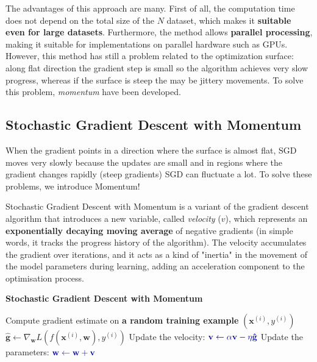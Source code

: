 The advantages of this approach are many. First of all, the computation time does not depend on the total size of the $N$ dataset, which makes it \textbf{suitable even for large datasets}. Furthermore, the method allows \textbf{parallel processing}, making it suitable for implementations on parallel hardware such as GPUs. However, this method has still a problem related to the optimization surface: along flat direction the gradient step is small so the algorithm achieves very slow progress, whereas if the surface is steep the may be jittery movements.  To solve this problem, \textit{momentum} have been developed.

\subsection{Stochastic Gradient Descent with Momentum}
When the gradient points in a direction where the surface is almost flat, SGD moves very slowly because the updates are small and in regions where the gradient changes rapidly (steep gradients) SGD can fluctuate a lot. To solve these problems, we introduce Momentum!

Stochastic Gradient Descent with Momentum is a variant of the gradient descent algorithm that introduces a new variable, called \textit{velocity} (\(v\)), which represents an \textbf{exponentially decaying moving average} of negative gradients (in simple words, it tracks the progress history of the algorithm). The velocity accumulates the gradient over iterations, and it acts as a kind of "inertia" in the movement of the model parameters during learning, adding an acceleration component to the optimisation process.

\begin{algorithm}
\renewcommand\thealgorithm{}
\caption{\textbf{\textcolor{mygreen}{Stochastic Gradient Descent with Momentum}}}
\begin{algorithmic}[1]
    \STATE Compute gradient estimate on \textbf{\textcolor{myred}{a random training example}} $(\mathbf{x}^{(i)}, y^{(i)})$
    \STATE 
    $
    \mathbf{\hat{g}} \leftarrow\nabla_{\mathbf{w}} L(f(\mathbf{x}^{(i)},\mathbf{w}), y^{(i)})
    $
    \STATE Update the velocity:
    $\textcolor{mybluee}{\mathbf{v} \leftarrow \alpha \mathbf{v} - \eta \mathbf{\hat{g}}}$
    \STATE Update the parameters:
    $\textcolor{mybluee}{\mathbf{w} \leftarrow \mathbf{w} + \mathbf{v}}$
\ENDWHILE
\end{algorithmic}
\end{algorithm}

